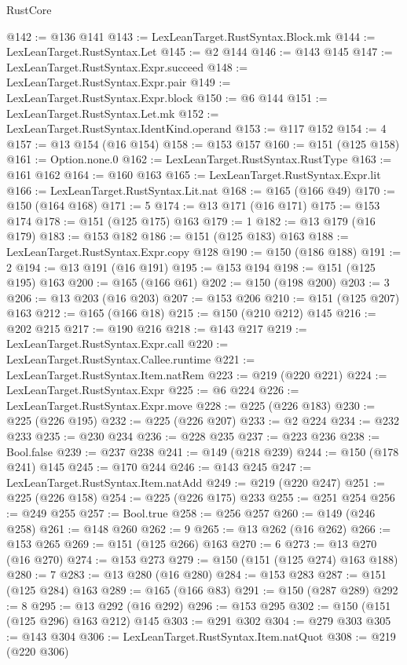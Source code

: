 \begin{lexlean}{RustCore}
\begin{coremodule}
@142 := @136 @141
@143 := LexLeanTarget.RustSyntax.Block.mk
@144 := LexLeanTarget.RustSyntax.Let
@145 := @2 @144
@146 := @143 @145
@147 := LexLeanTarget.RustSyntax.Expr.succeed
@148 := LexLeanTarget.RustSyntax.Expr.pair
@149 := LexLeanTarget.RustSyntax.Expr.block
@150 := @6 @144
@151 := LexLeanTarget.RustSyntax.Let.mk
@152 := LexLeanTarget.RustSyntax.IdentKind.operand
@153 := @117 @152
@154 := 4
@157 := @13 @154 (@16 @154)
@158 := @153 @157
@160 := @151 (@125 @158)
@161 := Option.none.{0}
@162 := LexLeanTarget.RustSyntax.RustType
@163 := @161 @162
@164 := @160 @163
@165 := LexLeanTarget.RustSyntax.Expr.lit
@166 := LexLeanTarget.RustSyntax.Lit.nat
@168 := @165 (@166 @49)
@170 := @150 (@164 @168)
@171 := 5
@174 := @13 @171 (@16 @171)
@175 := @153 @174
@178 := @151 (@125 @175) @163
@179 := 1
@182 := @13 @179 (@16 @179)
@183 := @153 @182
@186 := @151 (@125 @183) @163
@188 := LexLeanTarget.RustSyntax.Expr.copy @128
@190 := @150 (@186 @188)
@191 := 2
@194 := @13 @191 (@16 @191)
@195 := @153 @194
@198 := @151 (@125 @195) @163
@200 := @165 (@166 @61)
@202 := @150 (@198 @200)
@203 := 3
@206 := @13 @203 (@16 @203)
@207 := @153 @206
@210 := @151 (@125 @207) @163
@212 := @165 (@166 @18)
@215 := @150 (@210 @212) @145
@216 := @202 @215
@217 := @190 @216
@218 := @143 @217
@219 := LexLeanTarget.RustSyntax.Expr.call
@220 := LexLeanTarget.RustSyntax.Callee.runtime
@221 := LexLeanTarget.RustSyntax.Item.natRem
@223 := @219 (@220 @221)
@224 := LexLeanTarget.RustSyntax.Expr
@225 := @6 @224
@226 := LexLeanTarget.RustSyntax.Expr.move
@228 := @225 (@226 @183)
@230 := @225 (@226 @195)
@232 := @225 (@226 @207)
@233 := @2 @224
@234 := @232 @233
@235 := @230 @234
@236 := @228 @235
@237 := @223 @236
@238 := Bool.false
@239 := @237 @238
@241 := @149 (@218 @239)
@244 := @150 (@178 @241) @145
@245 := @170 @244
@246 := @143 @245
@247 := LexLeanTarget.RustSyntax.Item.natAdd
@249 := @219 (@220 @247)
@251 := @225 (@226 @158)
@254 := @225 (@226 @175) @233
@255 := @251 @254
@256 := @249 @255
@257 := Bool.true
@258 := @256 @257
@260 := @149 (@246 @258)
@261 := @148 @260
@262 := 9
@265 := @13 @262 (@16 @262)
@266 := @153 @265
@269 := @151 (@125 @266) @163
@270 := 6
@273 := @13 @270 (@16 @270)
@274 := @153 @273
@279 := @150 (@151 (@125 @274) @163 @188)
@280 := 7
@283 := @13 @280 (@16 @280)
@284 := @153 @283
@287 := @151 (@125 @284) @163
@289 := @165 (@166 @83)
@291 := @150 (@287 @289)
@292 := 8
@295 := @13 @292 (@16 @292)
@296 := @153 @295
@302 := @150 (@151 (@125 @296) @163 @212) @145
@303 := @291 @302
@304 := @279 @303
@305 := @143 @304
@306 := LexLeanTarget.RustSyntax.Item.natQuot
@308 := @219 (@220 @306)

\end{coremodule}
\end{lexlean}
